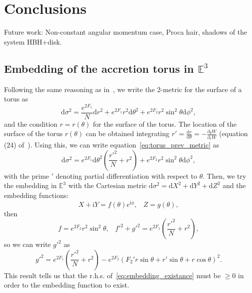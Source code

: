 \documentclass[twocolumn,aps,showpacs,showkeys,prd,superscriptaddress,byrevtex, amsmath]{revtex4-1}
\begin{document}
\section{Conclusions}
Future work: Non-constant angular momentum case, Proca hair, shadows of the system HBH+disk.

\begin{acknowledgements}

\end{acknowledgements}




\begin{appendix}
\section{Embedding of the accretion torus in $\mathbb{E}^3$}\label{torus_embedding}
Following the same reasoning as in~\cite{Delgado:2018}, we write the 2-metric for the surface of a torus as 
\begin{equation}\label{eq:torus_prev_metric}
\mathrm{d}\sigma^2 = \frac{e^{2 F_1}}{N}\mathrm{d}r^2+ e^{2 F_1}r^2\mathrm{d}\theta^2+e^{2 F_2} r^2 \sin^2\theta \mathrm{d}\phi^2,
\end{equation}
and the condition $r = r(\theta)$ for the surface of the torus. The location of the surface of the torus $r(\theta)$ can be obtained integrating $r' = \frac{\mathrm{d}r}{\mathrm{d}\theta} = -\frac{\partial_{\theta}W}{\partial_{r}W}$ (equation (24) of~\citep{Gimeno-Soler:2017}). Using this, we can write equation~\eqref{eq:torus_prev_metric} as
\begin{equation}\label{eq:torus_metric}
\mathrm{d}\sigma^2 = e^{2 F_1} \mathrm{d}\theta^2\left(\frac{r'^2}{N} +r^2\right)+e^{2 F_2} r^2 \sin^2\theta \mathrm{d}\phi^2,
\end{equation}
with the prime $'$ denoting partial differentiation with respect to $\theta$. Then, we try the embedding in $\mathbb{E}^3$ with the Cartesian metric $\mathrm{d}\sigma^2 = \mathrm{d}X^2 + \mathrm{d}Y^2 + \mathrm{d}Z^2$ and the embedding functions:
\begin{equation}
X + \mathrm{i}Y = f(\theta)e^{\mathrm{i}\phi},  \;\;\; Z = g(\theta),
\end{equation}
then
\begin{equation}
f = e^{2 F_2} r^2 \sin^2\theta, \;\;\; f'^2 + g'^2 = e^{2 F_1}\left(\frac{r'^2}{N} +r^2\right),
\end{equation}
so we can write $g'^2$ as
\begin{equation}\label{eq:embedding_existance}
g'^2 = e^{2 F_1}\left(\frac{r'^2}{N} +r^2\right) - e^{2 F_2} (F_2'r \sin \theta + r' \sin \theta + r \cos \theta)^2.
\end{equation}
This result tells us that the r.h.s. of~\eqref{eq:embedding_existance} must be $\geq 0$ in order to the embedding function to exist.


\end{appendix}
\end{document}
